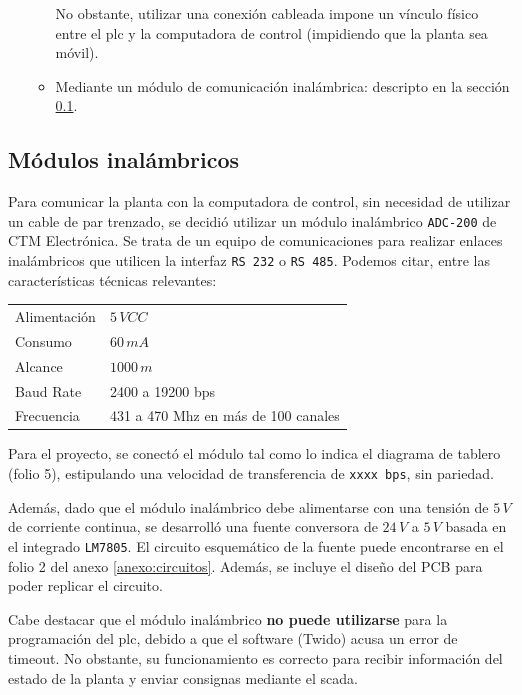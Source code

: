 \begin{itemize}
\begin{itemize}
No obstante, utilizar una conexión cableada impone un vínculo físico entre
el \gls{plc} y la computadora de control (impidiendo que la planta sea móvil).
\item Mediante un módulo de comunicación inalámbrica:
descripto en la sección \ref{subsec:inalambrico}.
\end{itemize}
\end{itemize}

\subsection{Módulos inalámbricos}
\label{subsec:inalambrico}

Para comunicar la planta con la computadora de control, sin necesidad de
utilizar un cable de par trenzado, se decidió utilizar un módulo inalámbrico
\verb|ADC-200| de CTM Electrónica.
Se trata de un equipo de comunicaciones para realizar enlaces inalámbricos que
utilicen la interfaz \verb|RS 232| o \verb|RS 485|.
Podemos citar, entre las características técnicas relevantes:

\begin{center}
\begin{tabular}{|l|l|}
\hline
Alimentación & $5\,VCC$\\
Consumo& $60\,mA$\\
Alcance& $1000\,m$\\
Baud Rate &2400 a 19200 bps \\
Frecuencia& 431 a 470 Mhz en más de 100 canales\\
\hline
\end{tabular}
\end{center}

Para el proyecto, se conectó el módulo tal como lo indica el
diagrama de tablero (folio 5), estipulando una velocidad de transferencia de
\verb|xxxx bps|, sin pariedad.

Además, dado que el módulo inalámbrico debe alimentarse con una tensión de
$5\,V$ de corriente continua, se desarrolló una fuente conversora de $24\,V$ a
$5\,V$ basada en el integrado \verb|LM7805|.
El circuito esquemático de la fuente puede encontrarse en el folio 2 del anexo
\ref{anexo:circuitos}.
Además, se incluye el diseño del PCB para poder replicar el circuito.

Cabe destacar que el módulo inalámbrico \textbf{no puede utilizarse} para
la programación del \gls{plc}, debido a que el software (Twido) acusa un error
de timeout.
No obstante, su funcionamiento es correcto para recibir información
del estado de la planta y enviar consignas mediante el \gls{scada}.

